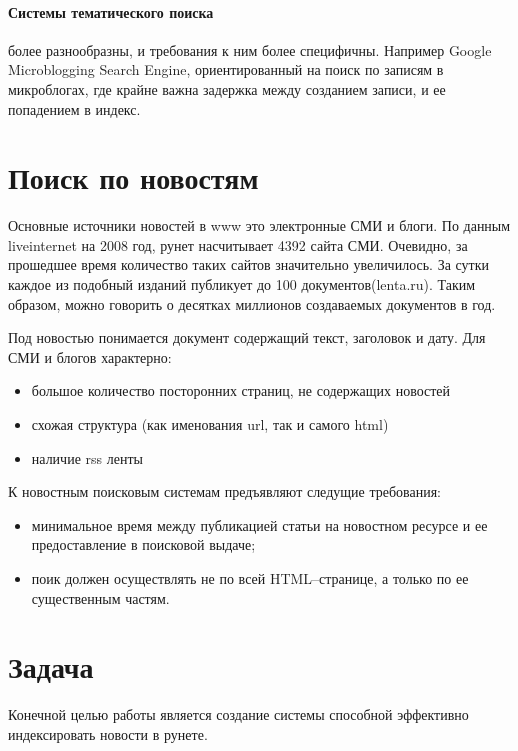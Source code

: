 \paragraph{Системы тематического поиска} более разнообразны, и требования к ним более специфичны.
 Например Google Microblogging Search Engine, ориентированный на поиск по записям в микроблогах,
где крайне важна задержка между созданием записи, и ее попадением в индекс.

\section{Поиск по новостям}

Основные источники новостей в www это электронные СМИ и блоги. По данным
liveinternet на 2008 год, рунет насчитывает 4392 сайта СМИ. 
Очевидно, за прошедшее время количество таких сайтов значительно увеличилось. За сутки каждое
из подобный изданий публикует до 100 документов(lenta.ru). Таким образом, 
можно говорить о десятках миллионов создаваемых документов в год.

Под новостью понимается документ содержащий текст, заголовок и дату. Для СМИ и
блогов характерно:
\begin{itemize} 
 \item большое количество посторонних страниц, не содержащих новостей
 \item схожая структура (как именования url, так и самого html)
 \item наличие rss ленты
\end{itemize}

К новостным поисковым системам предъявляют следущие требования:
\begin{itemize} 
\item минимальное время между публикацией статьи на новостном ресурсе и ее 
    предоставление в поисковой выдаче;
\item поик должен осуществлять не по всей HTML--странице, а только по ее 
    существенным частям. 
\end{itemize}

\section{Задача}
Конечной целью работы является создание системы способной эффективно индексировать новости в рунете.

